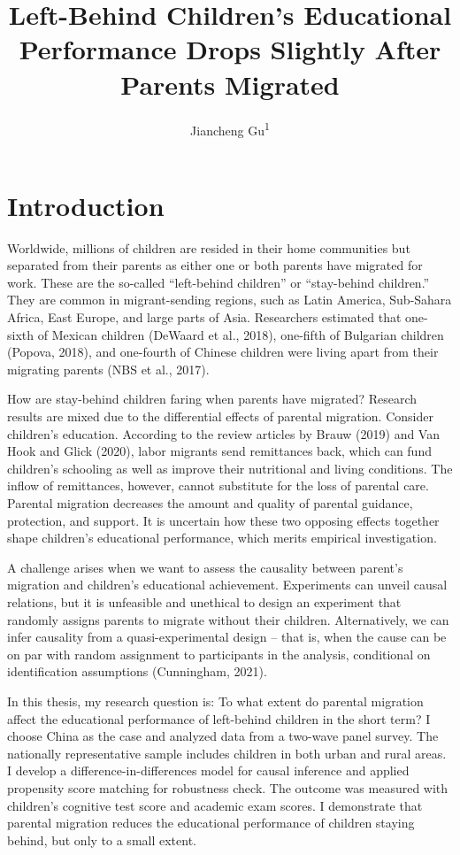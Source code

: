 \documentclass[
  man,floatsintext]{apa7}
\title{Left-Behind Children's Educational Performance Drops Slightly After Parents Migrated}
\author{Jiancheng Gu\textsuperscript{1}}
\date{}
\affiliation{\vspace{0.5cm}\textsuperscript{1} Faculty of Social Sciences, Vrije Universiteit Amsterdam}
\begin{document}
\maketitle

\hypertarget{introduction}{%
\section{Introduction}\label{introduction}}

Worldwide, millions of children are resided in their home communities but separated from their parents as either one or both parents have migrated for work. These are the so-called ``left-behind children'' or ``stay-behind children.'' They are common in migrant-sending regions, such as Latin America, Sub-Sahara Africa, East Europe, and large parts of Asia. Researchers estimated that one-sixth of Mexican children (DeWaard et al., 2018), one-fifth of Bulgarian children (Popova, 2018), and one-fourth of Chinese children were living apart from their migrating parents (NBS et al., 2017).

How are stay-behind children faring when parents have migrated? Research results are mixed due to the differential effects of parental migration. Consider children's education. According to the review articles by Brauw (2019) and Van Hook and Glick (2020), labor migrants send remittances back, which can fund children's schooling as well as improve their nutritional and living conditions. The inflow of remittances, however, cannot substitute for the loss of parental care. Parental migration decreases the amount and quality of parental guidance, protection, and support. It is uncertain how these two opposing effects together shape children's educational performance, which merits empirical investigation.

A challenge arises when we want to assess the causality between parent's migration and children's educational achievement. Experiments can unveil causal relations, but it is unfeasible and unethical to design an experiment that randomly assigns parents to migrate without their children. Alternatively, we can infer causality from a quasi-experimental design -- that is, when the cause can be on par with random assignment to participants in the analysis, conditional on identification assumptions (Cunningham, 2021).

In this thesis, my research question is: To what extent do parental migration affect the educational performance of left-behind children in the short term? I choose China as the case and analyzed data from a two-wave panel survey. The nationally representative sample includes children in both urban and rural areas. I develop a difference-in-differences model for causal inference and applied propensity score matching for robustness check. The outcome was measured with children's cognitive test score and academic exam scores. I demonstrate that parental migration reduces the educational performance of children staying behind, but only to a small extent.
\end{document}
